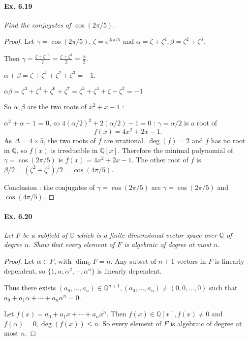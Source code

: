 \documentclass[11pt,a4paper]{article}
\newcommand{\Q}{\mathbb{Q}}
\newcommand{\C}{\mathbb{C}}
\begin{document}
\paragraph{Ex. 6.19}

{\it Find the conjugates of $\cos(2 \pi/5)$.
}

\begin{proof}
Let $\gamma = \cos(2 \pi/5)$, $\zeta= e^{2i\pi/5}$ and $\alpha = \zeta + \zeta^4, \beta= \zeta^2+\zeta^3$. 

Then $\gamma = \frac{\zeta + \zeta^{-1}}{2} = \frac{\zeta + \zeta^{4}}{2}  = \frac{\alpha}{2}$.

$\alpha + \beta = \zeta + \zeta^4+\zeta^2 + \zeta^3 = -1$.

$\alpha \beta= \zeta^3+ \zeta^4+\zeta^6+\zeta^7 = \zeta^3+ \zeta^4+\zeta+\zeta^2 = -1$

So $\alpha, \beta$ are the two roots of $x^2+x-1$ : 

$\alpha^2 + \alpha-1$ = 0, so $ 4(\alpha/2)^2 + 2 (\alpha/2) - 1=0$ : $\gamma = \alpha/2$ is a root of
$$f(x) = 4x^2+2x-1.$$
As $\Delta = 4 \times 5$, the two roots of $f$ are irrational. $\deg(f) = 2$ and $f$ has no root in $\Q$, so $f(x)$ is irreducible in $\Q[x]$. Therefore the minimal polynomial of $\gamma = \cos(2 \pi/5)$ is $f(x) = 4x^2+2x -1.$
The other root of $f$ is $\beta/2 = (\zeta^2+\zeta^3)/2 = \cos(4\pi/5)$.

Conclusion : the conjugates of $\gamma = \cos(2 \pi/5)$ are $\gamma = \cos(2 \pi/5)$ and $\cos(4 \pi/5)$.
\end{proof}

\paragraph{Ex. 6.20}

{\it Let $F$ be a subfield of $\C$ which is a finite-dimensional vector space over $\Q$ of degree $n$. Show that every element of $F$ is algebraic of degree at most $n$.
}

\begin{proof}
Let $\alpha \in F$, with $\dim_{\Q} F = n$.
Any subset of $n+1$ vectors in $F$ is linearly dependent, so $\{1,\alpha,\alpha^2,\cdots,\alpha^{n}\}$ is linearly dependent. 

Thus there exists $(a_0,\ldots,a_n) \in \Q^{n+1}, (a_0,\ldots,a_n) \ne (0,0,\ldots,0)$ such that $a_0+a_1\alpha +\cdots+a_n \alpha^n = 0$.

Let $f(x) = a_0+a_1x+\cdots+a_n x^n$. Then $f(x) \in \Q[x], f(x) \neq 0$ and $f(\alpha) = 0, \deg(f(x)) \leq n$. So  every element of $F$ is algebraic of degree at most $n$.
\end{proof}
\end{document}
